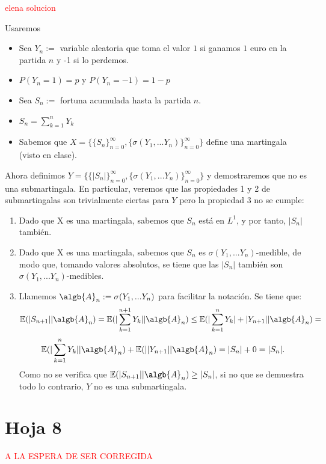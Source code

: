 \begin{problem}[3]
\textcolor{red}{elena solucion}
\begin{expla}
Usaremos
\begin{itemize}
\item Sea $Y_{n}:=$ variable aleatoria que toma el valor $1$ si ganamos $1$ euro en la partida $n$ y -1 si lo perdemos.
\item $P(Y_{n}=1)=p$ y $P(Y_{n}=-1)=1-p$
\item Sea $S_{n}:=$ fortuna acumulada hasta la partida $n$.
\item $S_{n}=\sum_{k=1}^{n} Y_k$
\item Sabemos que $X=\{\{S_n\}_{n=0}^{\infty},  \{\sigma(Y_1,...Y_n)\}_{n=0}^{\infty}\}$ define una martingala (visto en clase).
\end{itemize}
\end{expla}
Ahora definimos  $Y=\{\{|S_n|\}_{n=0}^{\infty},  \{\sigma(Y_1,...Y_n)\}_{n=0}^{\infty}\}$ y demostraremos que no es una submartingala. En particular, veremos que las propiedades 1 y 2 de submartingalas son trivialmente ciertas para $Y$ pero la propiedad 3 no se cumple:

\begin {enumerate}
\item Dado que X es una martingala, sabemos que $S_{n}$ está en $L^1$, y por tanto,  $|S_{n}|$ también.
\item Dado que X es una martingala, sabemos que  $S_{n}$ es $\sigma(Y_1,...Y_n)$-medible, de modo que, tomando valores absolutos, se tiene que las  $|S_{n}|$ también son $\sigma(Y_1,...Y_n)$-medibles.

\item Llamemos $\algb{A}_{n}:=\sigma(Y_1,...Y_n)$ para facilitar la notación. Se tiene que:
\[
 \mathbb{E}(|S_{n+1}||\algb{A}_{n}) = \mathbb{E}(|\sum_{k=1}^{n+1} Y_k||\algb{A}_{n}) \leq  \mathbb{E}(|\sum_{k=1}^{n} Y_k|+ |Y_{n+1}||\algb{A}_{n})  =
\]
\[
  \mathbb{E}(|\sum_{k=1}^{n} Y_k||\algb{A}_{n})  +  \mathbb{E}(| |Y_{n+1}||\algb{A}_{n}) = |S_{n}| + 0 = |S_{n}|.
\]
Como no se verifica que $ \mathbb{E}(|S_{n+1}||\algb{A}_{n}) \geq |S_n|$, si no que se demuestra todo lo contrario,  $Y$ no es una submartingala.
\end{enumerate}


\end{problem}


\newpage
\section{Hoja 8}
\textcolor{red}{A LA ESPERA DE SER CORREGIDA}

